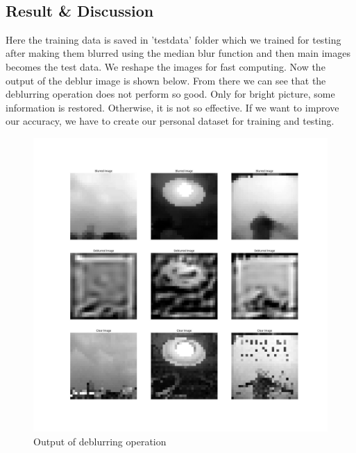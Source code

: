 \documentclass{article}
\begin{document}
{\begin{lstlisting}[language=Python, caption=Code for blurring and deblurring images]
    \end{lstlisting}
    \\
    \subsection{Result & Discussion}{
        Here the training data is saved in 'testdata' folder which we trained for testing after making them blurred using the median blur function and then main images becomes the test data. We reshape the images for fast computing. Now the output of the deblur image is shown below. From there we can see that the deblurring operation does not perform so good. Only for bright picture, some information is restored. Otherwise, it is not so effective. If we want to improve our accuracy, we have to create our personal dataset for training and testing.
        
        \begin{figure}[htp]
            
            \includegraphics[width=1.0\textwidth]{Assignment-15/fig-1.jpg}
            \caption{Output of deblurring operation}
        \end{figure}
    }
}
\clearpage
\end{document}
